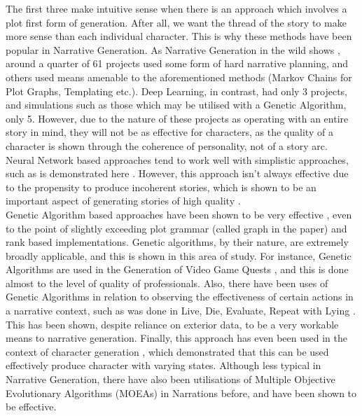 \documentclass[11pt]{article}
\begin{document}
The first three make intuitive sense when there is an approach which involves a plot first form of generation. After all, we want the thread of the story to make more sense than each individual character. This is why these methods have been popular in Narrative Generation. As Narrative Generation in the wild shows \cite{van-stegeren-theune-2019-narrative}, around a quarter of 61 projects used some form of hard narrative planning, and others used means amenable to the aforementioned methods (Markov Chains for Plot Graphs, Templating etc.). Deep Learning, in contrast, had only 3 projects, and simulations such as those which may be utilised with a Genetic Algorithm, only 5. However, due to the nature of these projects as operating with an entire story in mind, they will not be as effective for characters, as the quality of a character is shown through the coherence of personality, not of a story arc. Neural Network based approaches tend to work well with simplistic approaches, such as is demonstrated here \cite{NeuralNetworkOne}. However, this approach isn't always effective due to the propensity to produce incoherent stories, which is shown to be an important aspect of generating stories of high quality \cite{sagarkar-etal-2018-quality}. \\

Genetic Algorithm based approaches have been shown to be very effective \cite{mcintyre-lapata-2010-plot}, even to the point of slightly exceeding plot grammar (called graph in the paper) and rank based implementations. Genetic algorithms, by their nature, are extremely broadly applicable, and this is shown in this area of study. For instance, Genetic Algorithms are used in the Generation of Video Game Quests \cite{questgeneration}, and this is done almost to the level of quality of professionals. Also, there have been uses of Genetic Algorithms in relation to observing the effectiveness of certain actions in a narrative context, such as was done in Live, Die, Evaluate, Repeat with Lying \cite{Riegl2018LiveDE}. This has been shown, despite reliance on exterior data, to be a very workable means to narrative generation. Finally, this approach has even been used in the context of character generation \cite{charactergeneration}, which demonstrated that this can be used effectively produce character with varying states. Although less typical in Narrative Generation, there have also been utilisations of Multiple Objective Evolutionary Algorithms (MOEAs) in Narrations before\cite{MOEANarrative}, and have been shown to be effective.   
\end{document}
